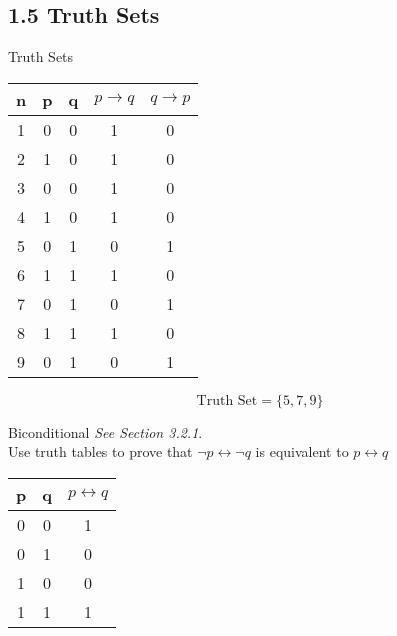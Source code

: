 \documentclass[12pt]{article}
\begin{document}

\subsection*{1.5 Truth Sets}

{Truth Sets}

\begin{center}
\begin{tabular}{|c||c|c||c||c|}
\hline \phantom{sp} n \phantom{sp} & \phantom{sp} p \phantom{sp} & \phantom{sp}q \phantom{sp}& \phantom{s} $  p \rightarrow q$ \phantom{s}& \phantom{s} $q \rightarrow p$ \phantom{s}\\  \hline
\hline 1 & 0 & 0 & 1 & 0\\ 
\hline 2 & 1 & 0 & 1 & 0\\ 
\hline 3 & 0 & 0 & 1 & 0\\ 
\hline 4 & 1 & 0 & 1 & 0\\ 
\hline 5 & 0 & 1 & 0 & 1\\ 
\hline 6 & 1 & 1 & 1 & 0\\ 
\hline 7 & 0 & 1 & 0 & 1\\ 
\hline 8 & 1 & 1 & 1 & 0\\ 
\hline 9 & 0 & 1 & 0 & 1\\ 
\hline 
\end{tabular} 
\end{center}
\[\mbox{Truth Set} = \{5,7,9\}\]



{Biconditional}
\emph{See Section 3.2.1}.\\

Use truth tables to prove that $ \neg p \leftrightarrow \neg q $ is equivalent to  $ p \leftrightarrow q $
\begin{center}
\begin{tabular}{|c|c|c|}
\hline  p& q & $p \leftrightarrow q$ \\ 
\hline  0& 0 &  1\\ 
\hline  0& 1 &  0\\ 
\hline  1& 0 &  0\\ 
\hline  1& 1 &  1\\ 
\hline 
\end{tabular}
\end{center} 
\end{document}
